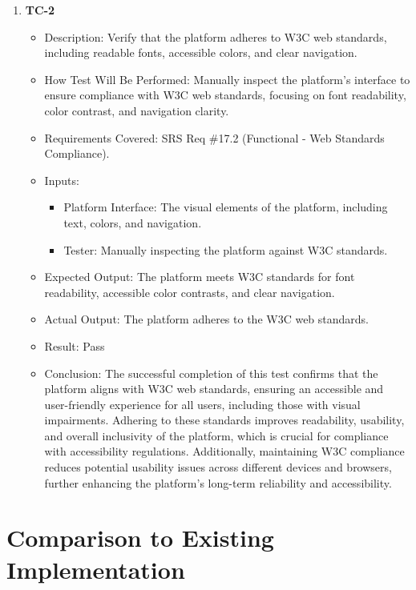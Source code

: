\documentclass[12pt, titlepage]{article}
\begin{document}
\begin{enumerate}
    \item \textbf{TC-2}  
    \begin{itemize}
        \item Description: Verify that the platform adheres to W3C web standards, including readable fonts, accessible colors, and clear navigation.
        \item How Test Will Be Performed: Manually inspect the platform's interface to ensure compliance with W3C web standards, focusing on font readability, color contrast, and navigation clarity.
        \item Requirements Covered: SRS Req \#17.2 (Functional - Web Standards Compliance).
        \item Inputs:  
            \begin{itemize}
                \item Platform Interface: The visual elements of the platform, including text, colors, and navigation.
                \item Tester: Manually inspecting the platform against W3C standards.
            \end{itemize}
        \item Expected Output: The platform meets W3C standards for font readability, accessible color contrasts, and clear navigation.
        \item Actual Output: The platform adheres to the W3C web standards.
        \item Result: Pass
        \item Conclusion: The successful completion of this test confirms that the platform aligns with W3C web standards,
		ensuring an accessible and user-friendly experience for all users, including those with visual impairments.
		Adhering to these standards improves readability, usability, and overall inclusivity of the platform,
		which is crucial for compliance with accessibility regulations. Additionally,
		maintaining W3C compliance reduces potential usability issues across different devices and browsers,
		further enhancing the platform’s long-term reliability and accessibility.
    \end{itemize}

\end{enumerate}
	
\section{Comparison to Existing Implementation}	
\end{document}
